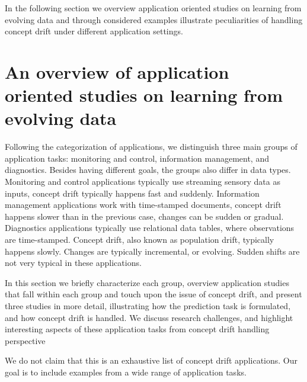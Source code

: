 \documentclass{llncs}
\begin{document}
In the following section we overview application oriented studies on learning from evolving data and through considered examples illustrate peculiarities of handling concept drift under different application settings.


\section{An overview of application oriented studies on learning from evolving data}
\label{sec:applications}
Following the categorization of applications, we distinguish three main groups of application tasks: monitoring and control, information management, and diagnostics. Besides having different goals, the groups also differ in data types. Monitoring and control applications typically use streaming sensory data as inputs, concept drift typically happens fast and suddenly.
Information management applications work with time-stamped documents, concept drift happens slower than in the previous case, changes can be sudden or gradual.
Diagnostics applications typically use relational data tables, where observations are time-stamped. Concept drift, also known as population drift, typically happens slowly. Changes are typically incremental, or evolving. Sudden shifts are not very typical in these applications.

In this section we briefly characterize each group, overview application studies that fall within each group and touch upon the issue of concept drift, and present three studies in more detail, illustrating how the prediction task is formulated, and how concept drift is handled.
We discuss research challenges, and highlight interesting aspects of these application tasks from concept drift handling perspective

We do not claim that this is an exhaustive list of concept drift applications.
Our goal is to include examples from a wide range of application tasks.

\end{document}
